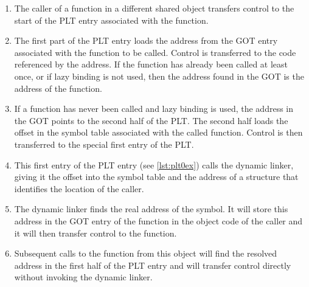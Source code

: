 \documentclass[english,11pt,twoside,toc=bib,toc=idx]{scrreprt}
\begin{document}
\begin{enumerate}
\item The caller of a function in a different shared object transfers
  control to the start of the PLT entry associated with the function.
\item The first part of the PLT entry loads the address from the GOT
  entry associated with the function to be called.  Control is
  transferred to the code referenced by the address.  If the function
  has already been called at least once, or if lazy binding is not used,
  then the address found in the GOT is the address of the function.
\item If a function has never been called and lazy binding is used,
  the address in the GOT points to the second half of the PLT\@.
  The second half loads the offset in the symbol table associated with
  the called function.  Control is then transferred to the special
  first entry of the PLT\@.
\item This first entry of the PLT entry (see \cref{lst:plt0ex})
  calls the dynamic linker, giving it the offset into the symbol table
  and the address of a structure that identifies the location of the
  caller.
\item The dynamic linker finds the real address of the symbol.  It
  will store this address in the GOT entry of the function in the
  object code of the caller and it will then transfer control to the
  function.
\item Subsequent calls to the function from this object will find the
  resolved address in the first half of the PLT entry and will
  transfer control directly without invoking the dynamic linker.
\end{enumerate}
\end{document}
